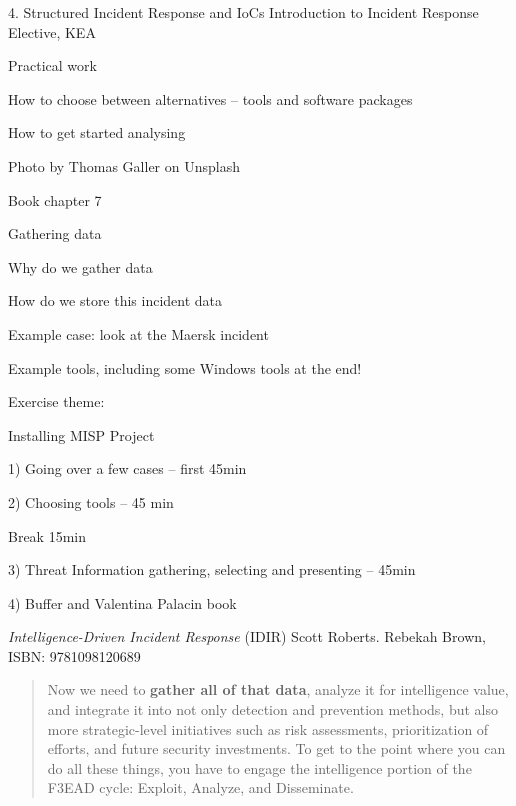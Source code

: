 \documentclass[Screen16to9,17pt]{foils}
\begin{document}
\mytitlepage
{4. Structured Incident Response and IoCs}
{Introduction to Incident Response Elective, KEA}




\begin{list2}
\item Practical work
\item How to choose between alternatives -- tools and software packages
\item How to get started analysing
\end{list2}

{\hfill \small Photo by Thomas Galler on Unsplash}


\begin{list2}
\item Book chapter 7
\item Gathering data
\item Why do we gather data
\item How do we store this incident data
\item Example case: look at the Maersk incident
\item Example tools, including some Windows tools at the end!
\end{list2}

Exercise theme:
\begin{list2}
\item Installing MISP Project
\end{list2}


\begin{list2}
\item 1) Going over a few cases -- first 45min
\item 2) Choosing tools -- 45 min
\item Break 15min
\item 3) Threat Information gathering, selecting and presenting -- 45min
\item 4) Buffer and Valentina Palacin book
\end{list2}



\emph{Intelligence-Driven Incident Response} (IDIR)
 Scott Roberts. Rebekah Brown, ISBN: 9781098120689

\begin{quote}
Now we need to {\bf gather all of that data}, analyze it for intelligence value, and integrate it into not only detection and prevention methods, but also more strategic-level initiatives such as risk assessments, prioritization of efforts, and future security investments. To get to the point where you can do all these things, you have to engage the intelligence portion of the F3EAD cycle: Exploit, Analyze, and Disseminate.
\end{quote}
\end{document}

